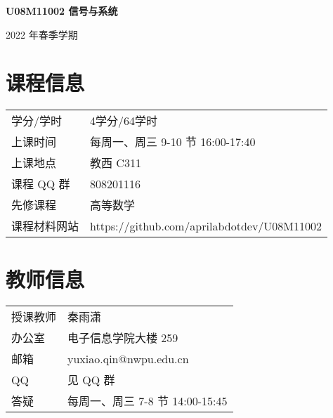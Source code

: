 \documentclass[letterpaper]{article}
\def\name{\textbf{U08M11002 信号与系统}}
\begin{document}
{\huge \name}


\vspace{0.1in}

\begin{minipage}{0.8\linewidth}
	2022 年春季学期
\end{minipage}


\section*{\textsc{课程信息}}
\begin{tabular}{ll}
学分/学时 & 4学分/64学时 \vspace{.5em}\\
上课时间 & 	每周一、周三 9-10 节 16:00-17:40 \vspace{.5em}\\
上课地点 &	教西 C311 \vspace{.5em}\\
课程 QQ 群 & 808201116  \vspace{.5em}\\
先修课程 & 高等数学 \vspace{.5em}\\
课程材料网站 & https://github.com/aprilabdotdev/U08M11002 \vspace{.5em}\\
\end{tabular}


\section*{\textsc{教师信息}}
\begin{tabular}{ll}
授课教师 & 	秦雨潇 \vspace{.5em}\\
办公室 &	电子信息学院大楼 259 \vspace{.5em}\\
邮箱 & yuxiao.qin@nwpu.edu.cn  \vspace{.5em}\\
QQ & 见 QQ 群 \vspace{.5em}\\
答疑 & 每周一、周三 7-8 节 14:00-15:45 \vspace{.5em}\\
\end{tabular}
\end{document}
